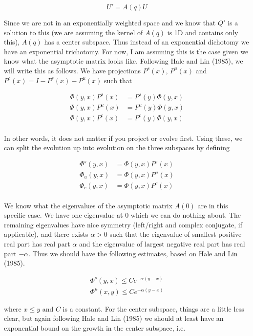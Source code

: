\documentclass[12pt]{article}
\begin{document}
\begin{equation}\label{Wprime}
U' = A(q) U
\end{equation}

Since we are not in an exponentially weighted space and we know that $Q'$ is a solution to this (we are assuming the kernel of $A(q)$ is 1D and contains only this), $A(q)$ has a center subspace. Thus instead of an exponential dichotomy we have an exponential trichotomy. For now, I am assuming this is the case given we know what the asymptotic matrix looks like. Following Hale and Lin (1985), we will write this as follows. We have projections $P^s(x)$, $P^u(x)$ and $P^c(x) = I - P^s(x) - P^u(x)$ such that

\begin{align*}
\Phi(y, x)P^s(x) &= P^s(y)\Phi(y, x) \\
\Phi(y, x)P^u(x) &= P^u(y)\Phi(y, x) \\
\Phi(y, x)P^c(x) &= P^c(y)\Phi(y, x) \\
\end{align*}

In other words, it does not matter if you project or evolve first. Using these, we can split the evolution up into evolution on the three subspaces by defining

\begin{align*}
\Phi^s(y, x) &= \Phi(y, x)P^s(x) \\
\Phi_u(y, x) &= \Phi(y, x)P^u(x) \\
\Phi_c(y, x) &= \Phi(y, x)P^c(x) \\
\end{align*}

We know what the eigenvalues of the asymptotic matrix $A(0)$ are in this specific case. We have one eigenvalue at 0 which we can do nothing about. The remaining eigenvalues have nice symmetry (left/right and complex conjugate, if applicable), and there exists $\alpha > 0$ such that the eigenvalue of smallest positive real part has real part $\alpha$ and the eigenvalue of largest negative real part has real part $-\alpha$. Thus we should have the following estimates, based on Hale and Lin (1985).

\begin{align*}
\Phi^s(y, x) \leq C e^{-\alpha(y-x)} \\
\Phi^u(x, y) \leq C e^{-\alpha(y-x)}
\end{align*}

where $x \leq y$ and $C$ is a constant. For the center subspace, things are a little less clear, but again following Hale and Lin (1985) we should at least have an exponential bound on the growth in the center subspace, i.e.
\end{document}
